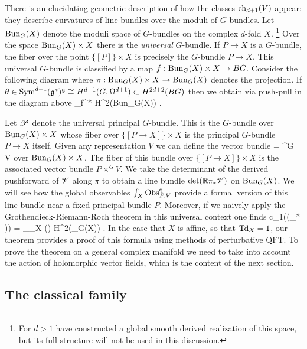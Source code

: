 \documentclass[10pt]{amsart}
\begin{document}
There is an elucidating geometric description of how the classes ${\rm ch}_{d+1}(V)$ appear: they describe curvatures of line bundles over the moduli of $G$-bundles.
Let ${\rm Bun}_{G}(X)$ denote the moduli space of $G$-bundles on the complex $d$-fold $X$. \footnote{For $d > 1$ \cite{FHK} have constructed a global smooth derived realization of this space, but its full structure will not be used in this discussion.}
Over the space ${\rm Bun}_G(X) \times X$ there is the {\em universal} $G$-bundle. 
If $P \to X$ is a $G$-bundle, the fiber over the point $\{[P]\} \times X$ is precisely the $G$-bundle $P \to X$. 
This universal $G$-bundle is classified by a map $f : {\rm Bun}_G(X) \times X \to B G$. 
Consider the following diagram
\ben
{}
\een
where $\pi : {\rm Bun}_G(X) \times X \to {\rm Bun}_G(X)$ denotes the projection. 
If $\theta \in {\rm Sym}^{d+1}(\mathfrak g^*)^\mathfrak g \cong H^{d+1}(G , \Omega^{d+1}) \subset H^{2d+2}(BG)$ then we obtain via push-pull in the diagram above
\ben
\int_\pi \circ f^* \theta \in H^2({\rm Bun}_G(X)) .
\een 

Let $\mathscr P$ denote the universal principal $G$-bundle.
This is the $G$-bundle over ${\rm Bun}_G(X) \times X$ whose fiber over $\{[P\to X]\} \times X$ is the principal $G$-bundle $P \to X$ itself. 
Given any representation $V$ we can define the vector bundle
\ben
\sV = \sP \times^G V
\een
over ${\rm Bun}_G(X) \times X$.
The fiber of this bundle over $\{[P\to X]\} \times X$ is the associated vector bundle $P \times^G V$. 
We take the determinant of the derived pushforward of $\mathscr V$ along $\pi$ to obtain a line bundle $\det(\mathbb R \pi_* \mathscr V)$ on ${\rm Bun}_G(X)$. 
We will see how the global observables $\int_X {\rm Obs}^{\rm q}_{P,V}$ provide a formal version of this line bundle near a fixed principal bundle $P$. 
Moreover, if we naively apply the Grothendieck-Riemann-Roch theorem in this universal context one finds
\ben
c_1(\det(\RR \pi_* \sV)) = \int__X (\sV) \in H^2(\Bun_G(X)) .
\een
In the case that $X$ is affine, so that ${\rm Td}_X = 1$, our theorem provides a proof of this formula using methods of perturbative QFT. 
To prove the theorem on a general complex manifold we need to take into account the action of holomorphic vector fields, which is the content of the next section.

\subsection{The classical family}\label{sec: classical g equiv} 
\end{document}
